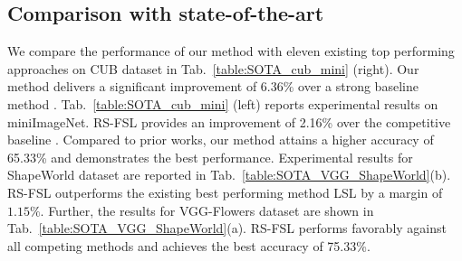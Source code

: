 \documentclass{bmvc2k}
\begin{document}
\subsection{Comparison with state-of-the-art}\label{sec:results}
\noindent We compare the performance of our method with eleven existing top performing approaches on CUB dataset in Tab.~\ref{table:SOTA_cub_mini} (right). Our method delivers a significant improvement of $6.36\%$ over a strong baseline method \cite{chen2020new}.
Tab.~\ref{table:SOTA_cub_mini} (left) reports experimental results on miniImageNet. RS-FSL provides an improvement of 2.16\% over the competitive baseline \cite{chen2020new}. Compared to prior works, our method attains a higher accuracy of 65.33\% and demonstrates the best performance. Experimental results for ShapeWorld dataset are reported in Tab.~\ref{table:SOTA_VGG_ShapeWorld}(b). RS-FSL outperforms the existing best performing method LSL \cite{mu2020shaping} by a margin of $1.15\%$. Further, the results for VGG-Flowers dataset are shown in Tab.~\ref{table:SOTA_VGG_ShapeWorld}(a). RS-FSL performs favorably against all competing methods and achieves the best accuracy of 75.33\%.
\end{document}
